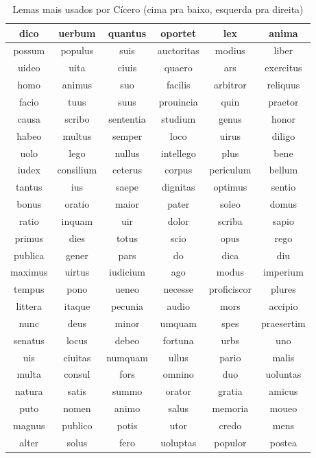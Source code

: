 \documentclass[pnumromarab, normaltoc, a4paper, 12pt]{abnt-unochapeco}
\begin{document}
\begin{table}[ht]
\caption{Lemas mais usados por Cícero (cima pra baixo, esquerda pra direita)}
\begin{center}
\begin{tabular}{|c|c|c|c|c|c|}
\hline
dico & uerbum & quantus & oportet & lex & anima \\ \hline
possum & populus & suis & auctoritas & modius & liber \\ \hline
uideo & uita & ciuis & quaero & ars & exercitus \\ \hline
homo & animus & suo & facilis & arbitror & reliquus \\ \hline
facio & tuus & suus & prouincia & quin & praetor \\ \hline
causa & scribo & sententia & studium & genus & honor \\ \hline
habeo & multus & semper & loco & uirus & diligo \\ \hline
uolo & lego & nullus & intellego & plus & bene \\ \hline
iudex & consilium & ceterus & corpus & periculum & bellum \\ \hline
tantus & ius & saepe & dignitas & optimus & sentio \\ \hline
bonus & oratio & maior & pater & soleo & domus \\ \hline
ratio & inquam & uir & dolor & scriba & sapio \\ \hline
primus & dies & totus & scio & opus & rego \\ \hline
publica & gener & pars & do & dica & diu \\ \hline
maximus & uirtus & iudicium & ago & modus & imperium \\ \hline
tempus & pono & ueneo & necesse & proficiscor & plures \\ \hline
littera & itaque & pecunia & audio & mors & accipio \\ \hline
nunc & deus & minor & umquam & spes & praesertim \\ \hline
senatus & locus & debeo & fortuna & urbs & uno \\ \hline
uis & ciuitas & numquam & ullus & pario & malis \\ \hline
multa & consul & fors & omnino & duo & uoluntas \\ \hline
natura & satis & summo & orator & gratia & amicus \\ \hline
puto & nomen & animo & salus & memoria & moueo \\ \hline
magnus & publico & potis & utor & credo & mens \\ \hline
alter & solus & fero & uoluptas & populor & postea \\ \hline
\end{tabular}
\end{center}
\end{table}

\end{document}
